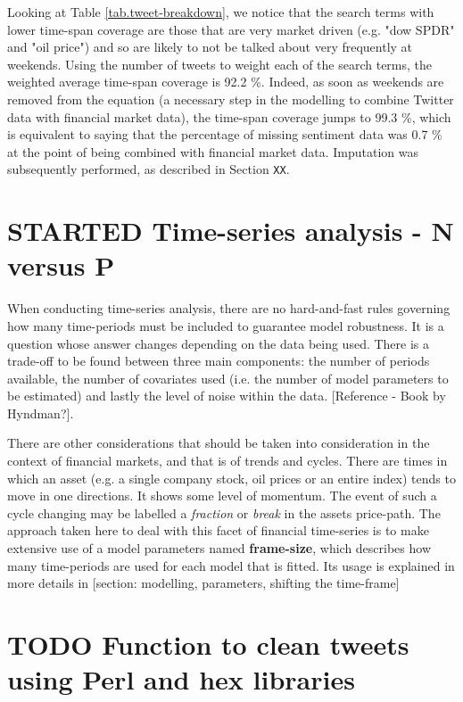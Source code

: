 \documentclass{article}
\begin{document}
Looking at Table \ref{tab.tweet-breakdown}, we notice that the search terms with lower time-span coverage are those that are very market driven (e.g. "dow SPDR" and "oil price") and so are likely to not be talked about very frequently at weekends. Using the number of tweets to weight each of the search terms, the weighted average time-span coverage is 92.2 \%. Indeed, as soon as weekends are removed from the equation (a necessary step in the modelling to combine Twitter data with financial market data), the time-span coverage jumps to 99.3 \%, which is equivalent to saying that the percentage of missing sentiment data was 0.7 \% at the point of being combined with financial market data. Imputation was subsequently performed, as described in Section \texttt{XX}.


\section{{\bfseries\sffamily STARTED} Time-series analysis - N versus P}
\label{sec-4}
When conducting time-series analysis, there are no hard-and-fast rules governing how many time-periods must be included to guarantee model robustness. It is a question whose answer changes depending on the data being used. There is a trade-off to be found between three main components: the number of periods available, the number of covariates used (i.e. the number of model parameters to be estimated) and lastly the level of noise within the data. [Reference - Book by Hyndman?].

There are other considerations that should be taken into consideration in the context of financial markets, and that is of trends and cycles. There are times in which an asset (e.g. a single company stock, oil prices or an entire index) tends to move in one directions. It shows some level of momentum. The event of such a cycle changing may be labelled a \emph{fraction} or \emph{break} in the assets price-path. The approach taken here to deal with this facet of financial time-series is to make extensive use of a model parameters named \textbf{frame-size}, which describes how many time-periods are used for each model that is fitted. Its usage is explained in more details in [section: modelling, parameters, shifting the time-frame]



\section{{\bfseries\sffamily TODO} Function to clean tweets using Perl and hex libraries}
\label{sec-5}
\end{document}

